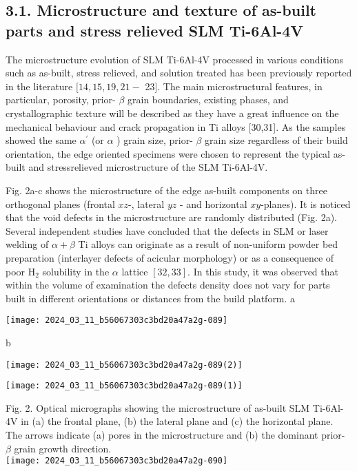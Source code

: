 \documentclass[10pt]{article}
\begin{document}
\subsection*{3.1. Microstructure and texture of as-built parts and stress relieved SLM Ti-6Al-4V}
The microstructure evolution of SLM Ti-6Al-4V processed in various conditions such as as-built, stress relieved, and solution treated has been previously reported in the literature $[14,15,19,21-$ 23]. The main microstructural features, in particular, porosity, prior- $\beta$ grain boundaries, existing phases, and crystallographic texture will be described as they have a great influence on the mechanical behaviour and crack propagation in Ti alloys [30,31]. As the samples showed the same $\alpha^{\prime}$ (or $\alpha$ ) grain size, prior- $\beta$ grain size regardless of their build orientation, the edge oriented specimens were chosen to represent the typical as-built and stressrelieved microstructure of the SLM Ti-6Al-4V.

Fig. 2a-c shows the microstructure of the edge as-built components on three orthogonal planes (frontal $x z$-, lateral $y z$ - and horizontal $x y$-planes). It is noticed that the void defects in the microstructure are randomly distributed (Fig. 2a). Several independent studies have concluded that the defects in SLM or laser welding of $\alpha+\beta$ Ti alloys can originate as a result of non-uniform powder bed preparation (interlayer defects of acicular morphology) or as a consequence of poor $\mathrm{H}_{2}$ solubility in the $\alpha$ lattice $[32,33]$. In this study, it was observed that within the volume of examination the defects density does not vary for parts built in different orientations or distances from the build platform. a

\begin{center}
\texttt{[image: 2024\_03\_11\_b56067303c3bd20a47a2g-089]}
\end{center}

b

\begin{center}
\texttt{[image: 2024\_03\_11\_b56067303c3bd20a47a2g-089(2)]}
\end{center}

\begin{center}
\texttt{[image: 2024\_03\_11\_b56067303c3bd20a47a2g-089(1)]}
\end{center}

Fig. 2. Optical micrographs showing the microstructure of as-built SLM Ti-6Al-4V in (a) the frontal plane, (b) the lateral plane and (c) the horizontal plane. The arrows indicate (a) pores in the microstructure and (b) the dominant prior- $\beta$ grain growth direction.\\
\texttt{[image: 2024\_03\_11\_b56067303c3bd20a47a2g-090]}
\end{document}
